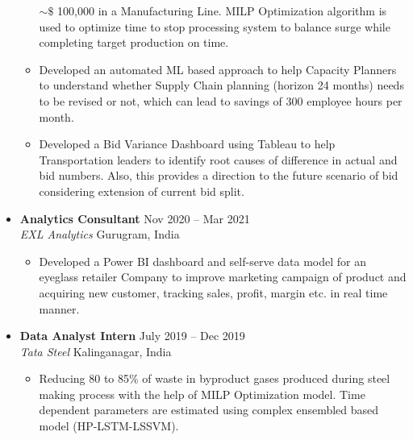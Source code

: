 \documentclass[a4paper,10pt]{article}
\newcommand{\resumeItem}[1]{\item\small{#1}}
\newcommand{\resumeSubheading}[4]{
  \vspace{1pt}\item
    \textbf{#1} \hfill {#2} \\
    \emph{#3} \hfill {#4} \\
}
\begin{document}
\begin{itemize}
\begin{itemize}
{            $\sim\$$ 100,000 in a Manufacturing Line. MILP Optimization algorithm is used to optimize time to stop processing
            system to balance surge while completing target production on time.
          }
          \resumeItem{
            Developed an automated ML based approach to help Capacity Planners to understand whether Supply Chain
            planning (horizon 24 months) needs to be revised or not, which can lead to savings of 300 employee hours per
            month.
          }
          \resumeItem{
            Developed a Bid Variance Dashboard using Tableau to help Transportation leaders to identify root causes of
            difference in actual and bid numbers. Also, this provides a direction to the future scenario of bid considering
            extension of current bid split.
          }
      \end{itemize}
    
    \resumeSubheading
      {Analytics Consultant}{Nov 2020 -- Mar 2021}
      {EXL Analytics}{Gurugram, India}
      \begin{itemize}
          \resumeItem{
            Developed a Power BI dashboard and self-serve data model for an eyeglass retailer Company to improve
            marketing campaign of product and acquiring new customer, tracking sales, profit, margin etc. in real time
            manner.
          }
      \end{itemize}

    \resumeSubheading
      {Data Analyst Intern}{July 2019 -- Dec 2019}
      {Tata Steel}{Kalinganagar, India}
      \begin{itemize}
          \resumeItem{
            Reducing 80 to 85\% of waste in byproduct gases produced during steel making process with the help of MILP
            Optimization model. Time dependent parameters are estimated using complex ensembled based model (HP-LSTM-LSSVM).
          }
      \end{itemize}
\end{itemize}

\end{document}
